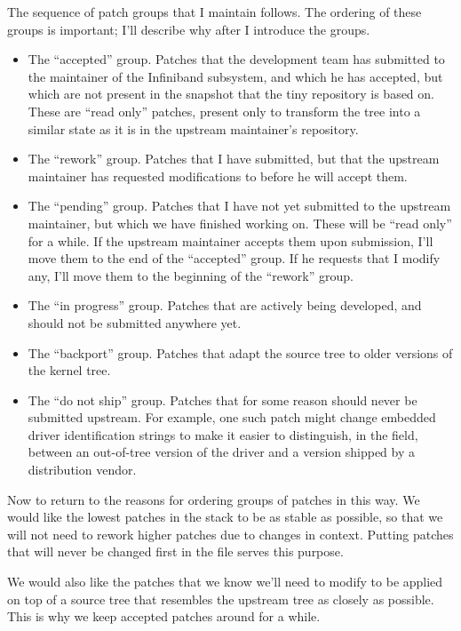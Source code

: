 The sequence of patch groups that I maintain follows.  The ordering of
these groups is important; I'll describe why after I introduce the
groups.
\begin{itemize}
\item The ``accepted'' group.  Patches that the development team has
  submitted to the maintainer of the Infiniband subsystem, and which
  he has accepted, but which are not present in the snapshot that the
  tiny repository is based on.  These are ``read only'' patches,
  present only to transform the tree into a similar state as it is in
  the upstream maintainer's repository.
\item The ``rework'' group.  Patches that I have submitted, but that
  the upstream maintainer has requested modifications to before he
  will accept them.
\item The ``pending'' group.  Patches that I have not yet submitted to
  the upstream maintainer, but which we have finished working on.
  These will be ``read only'' for a while.  If the upstream maintainer
  accepts them upon submission, I'll move them to the end of the
  ``accepted'' group.  If he requests that I modify any, I'll move
  them to the beginning of the ``rework'' group.
\item The ``in progress'' group.  Patches that are actively being
  developed, and should not be submitted anywhere yet.
\item The ``backport'' group.  Patches that adapt the source tree to
  older versions of the kernel tree.
\item The ``do not ship'' group.  Patches that for some reason should
  never be submitted upstream.  For example, one such patch might
  change embedded driver identification strings to make it easier to
  distinguish, in the field, between an out-of-tree version of the
  driver and a version shipped by a distribution vendor.
\end{itemize}

Now to return to the reasons for ordering groups of patches in this
way.  We would like the lowest patches in the stack to be as stable as
possible, so that we will not need to rework higher patches due to
changes in context.  Putting patches that will never be changed first
in the  file serves this purpose.

We would also like the patches that we know we'll need to modify to be
applied on top of a source tree that resembles the upstream tree as
closely as possible.  This is why we keep accepted patches around for
a while.


